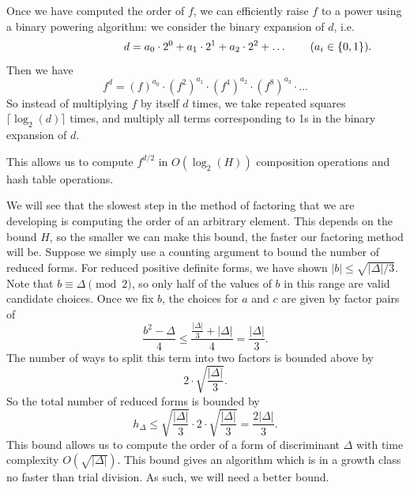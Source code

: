 \documentclass[honours,12pt]{unswthesis}
\newcommand{\N}{\mathbb{N}} %
\newcommand{\rnote}[1]{\rlap{\hspace{0.75cm}$#1$}}
\newcommand{\algosep}{
    \vspace{1mm}
    \par
    \nointerlineskip
    \moveleft\algomargin\vbox{\hrule width \columnwidth}
    \nointerlineskip
    \vspace{1mm}
}
\numberwithin{equation}{section}
\begin{document}
Once we have computed the order of $f$, we can efficiently raise $f$ to a power using a binary powering algorithm:
we consider the binary expansion of $d$, i.e.
$$d = a_0 \cdot 2^0 + a_1 \cdot 2^1 + a_2 \cdot 2^2 + \dots \rnote{(a_i \in \{0, 1\}).}$$
Then we have
$$f^d = (f)^{a_0} \cdot (f^2)^{a_1} \cdot (f^4)^{a_2} \cdot (f^8)^{a_3} \cdot \dots$$
So instead of multiplying $f$ by itself $d$ times, we take repeated squares $\lceil \log_2(d) \rceil$ times, and multiply all terms corresponding to 1s in the binary expansion of $d$.

\pagebreak
{}

\noindent
This allows us to compute $f^{d/2}$ in $O(\log_2(H))$ composition operations and hash table operations.

We will see that the slowest step in the method of factoring that we are developing is computing the order of an arbitrary element.
This depends on the bound $H$, so the smaller we can make this bound, the faster our factoring method will be.
Suppose we simply use a counting argument to bound the number of reduced forms.
For reduced positive definite forms, we have shown $|b| \leq \sqrt{|\Delta|/3}$.
Note that $b \equiv \Delta \pmod{2}$, so only half of the values of $b$ in this range are valid candidate choices.
Once we fix $b$, the choices for $a$ and $c$ are given by factor pairs of 
$$\frac{b^2 - \Delta}{4} \leq \frac{\frac{| \Delta |}{3} + | \Delta |}{4} = \frac{|\Delta|}{3}.$$
The number of ways to split this term into two factors is bounded above by
$$2 \cdot \sqrt{\frac{|\Delta|}{3}}.$$
So the total number of reduced forms is bounded by
$$h_\Delta \leq \sqrt{\frac{|\Delta|}{3}} \cdot 2 \cdot \sqrt{\frac{|\Delta|}{3}} = \frac{2 |\Delta|}{3}.$$
This bound allows us to compute the order of a form of discriminant $\Delta$ with time complexity $O(\sqrt{|\Delta|})$.
This bound gives an algorithm which is in a growth class no faster than trial division.
As such, we will need a better bound.
\end{document}
